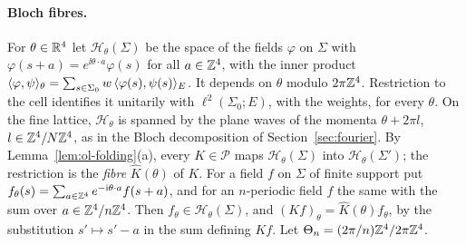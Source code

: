 \paragraph{Bloch fibres.} For $\theta\in\mathbb R^4$ let $\mathcal H_\theta(\Sigma)$ be the space of the fields $\varphi$ on $\Sigma$ with $\varphi(s+a)=e^{\ii\theta\cdot a}\varphi(s)$ for all $a\in\mathbb Z^4$, with the inner product $\langle \varphi,\psi\rangle_\theta=\sum_{s\in\Sigma_0}w\,\langle \varphi(s),\psi(s)\rangle_E$. It depends on $\theta$ modulo $2\pi\mathbb Z^4$. Restriction to the cell identifies it unitarily with $\ell^2(\Sigma_0;E)$, with the weights, for every $\theta$. On the fine lattice, $\mathcal H_\theta$ is spanned by the plane waves of the momenta $\theta+2\pi l$, $l\in\mathbb Z^4/N\mathbb Z^4$, as in the Bloch decomposition of Section~\ref{sec:fourier}. By Lemma~\ref{lem:ol-folding}(a), every $K\in\mathscr P$ maps $\mathcal H_\theta(\Sigma)$ into $\mathcal H_\theta(\Sigma')$; the restriction is the \emph{fibre} $\hat K(\theta)$ of $K$. For a field $f$ on $\Sigma$ of finite support put $f_\theta(s)=\sum_{a\in\mathbb Z^4}e^{-\mathrm i\theta\cdot a}f(s+a)$, and for an $n$-periodic field $f$ the same with the sum over $a\in\mathbb Z^4/n\mathbb Z^4$. Then $f_\theta\in\mathcal H_\theta(\Sigma)$, and $(Kf)_\theta=\hat K(\theta)f_\theta$, by the substitution $s'\mapsto s'-a$ in the sum defining $Kf$. Let $\Theta_n=(2\pi/n)\mathbb Z^4/2\pi\mathbb Z^4$.

